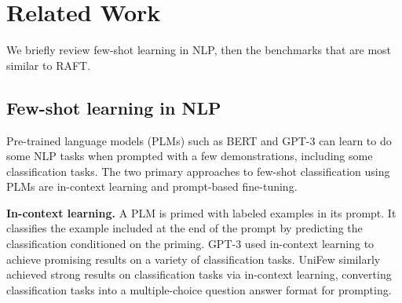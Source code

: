 \documentclass{article}
\newcommand{\name}{\textsc{RAFT}}
\begin{document}
\begin{comment}
Old Table 1
\begin{table}[h]
\centering
\begin{tabular}{m{6em}  M{1.5em} M{1.5em} M{1.5em} M{1.5em} M{1.5em} M{1.5em} M{1.5em} M{1.5em} M{1.5em} M{1.5em} M{1.5em} M{1.5em}}
\toprule
\textbf{Description} & \textit{ADE} & \textit{B77} & \textit{NIS} & \textit{OSE} & \textit{Over} & \textit{SOT} & \textit{SRI} & \textit{TAI} & \textit{ToS} & \textit{TEH} & \textit{TC} \\ 
\midrule
Long inputs & -- & -- & \checkmark & \checkmark & -- & -- & \checkmark & \checkmark & -- & -- & -- \\
Domain expertise & \checkmark & -- & -- & -- & \checkmark & -- & -- & \checkmark & \checkmark & -- & -- \\
Detailed instructions & -- & -- & -- & -- & -- & -- & \checkmark & \checkmark & \checkmark & \checkmark & -- \\
\bottomrule
\end{tabular}
\caption{Real-world challenges presented by multiple \name{} datasets. More information on \name{} datasets is in Section \ref{sec:dataset-description}.}
\label{tab:dataset-challenges}
\end{table}
\end{comment}


\section{Related Work}

We briefly review few-shot learning in NLP, then the benchmarks that are most similar to \name{}.

\subsection{Few-shot learning in NLP}

Pre-trained language models (PLMs) such as BERT \citep{devlin2019bert} and GPT-3 \citep{brown2020gpt3} can learn to do some NLP tasks when prompted with a few demonstrations, including some classification tasks. The two primary approaches to few-shot classification using PLMs are in-context learning and prompt-based fine-tuning.

\textbf{In-context learning.} A PLM is primed with labeled examples in its prompt. It classifies the example included at the end of the prompt by predicting the classification conditioned on the priming. GPT-3 \citep{brown2020gpt3} used in-context learning to achieve promising results on a variety of classification tasks. UniFew \citep{bragg2021flex} similarly achieved strong results on classification tasks via in-context learning, converting classification tasks into a multiple-choice question answer format for prompting.
\end{document}
